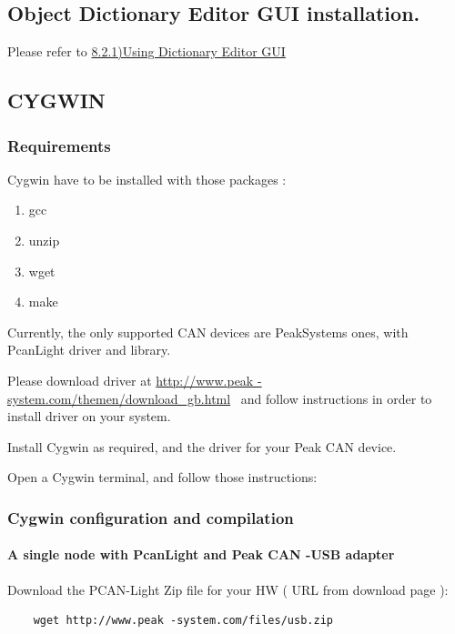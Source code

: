 \documentclass[12pt,english,a4paper]{book}
\begin{document}
\subsection{Object Dictionary Editor GUI installation.}

Please refer to \hyperlink{a821UsingDictionaryEditorGUIoutline}{8.2.1)Using
Dictionary Editor GUI}

\subsection{CYGWIN}

\subsubsection{Requirements}

Cygwin have to be installed with those packages :

\begin{enumerate}
\item gcc 
\item unzip 
\item wget 
\item make 
\end{enumerate}
Currently, the only supported CAN devices are PeakSystems ones, with
PcanLight driver and library.

Please download driver at \href{http://www.peak-system.com/themen/download_gb.html}{http://www.peak
-system.com/themen/download\_gb.html} \ and follow instructions
in order to install driver on your system.

Install Cygwin as required, and the driver for your Peak CAN device.

Open a Cygwin terminal, and follow those instructions:


\subsubsection{Cygwin configuration and compilation}


\paragraph{A single node with PcanLight and Peak CAN -USB adapter}

Download the PCAN-Light Zip file for your HW ( URL from download
page ):


\begin{verbatim}
	wget http://www.peak -system.com/files/usb.zip
\end{verbatim}
\end{document}
